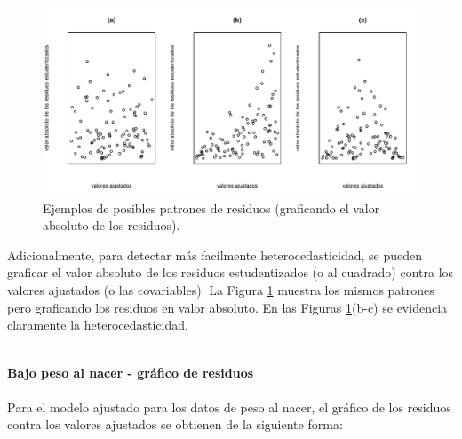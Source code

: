 \documentclass[
]{article}
\begin{document}
\begin{figure}

{\centering \includegraphics{MLG1_files/figure-latex/patronesResiduos2-1} 

}

\caption{Ejemplos de posibles patrones de residuos (graficando el valor absoluto de los residuos).}\label{fig:patronesResiduos2}
\end{figure}

Adicionalmente, para detectar más facilmente heterocedasticidad, se pueden graficar el valor absoluto de los residuos estudentizados (o al cuadrado) contra los valores ajustados (o las covariables). La Figura \ref{fig:patronesResiduos2} muestra los mismos patrones pero graficando los residuos en valor absoluto. En las Figuras \ref{fig:patronesResiduos2}(b-c) se evidencia claramente la heterocedasticidad.

\rule{\textwidth}{0.4pt}

\hypertarget{bajo-peso-al-nacer---gruxe1fico-de-residuos}{%
\paragraph*{Bajo peso al nacer - gráfico de residuos}\label{bajo-peso-al-nacer---gruxe1fico-de-residuos}}

Para el modelo ajustado para los datos de peso al nacer, el gráfico de los residuos contra los valores ajustados se obtienen de la siguiente forma:
\end{document}
